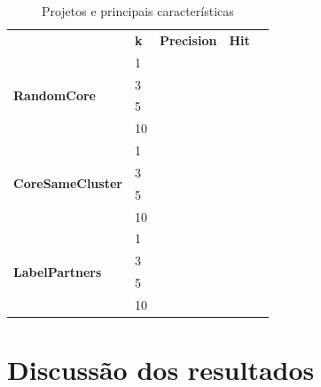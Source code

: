 \documentclass[12pt,openany,oneside,a4paper,english,brazil]{abntbibufjf}
\begin{document}
  \begin{table}[htbp]
  \caption{Projetos e principais características}
  \begin{center}
    \begin{tabular}{|l|l|l|l|l}
    \cline{1-4}
                                              & \textbf{k} & \textbf{Precision} & \textbf{Hit} &  \\ \cline{1-4}
    \multirow{4}{*}{\textbf{RandomCore}}      & 1          &                    &              &  \\ \cline{2-4}
                                              & 3          &                    &              &  \\ \cline{2-4}
                                              & 5          &                    &              &  \\ \cline{2-4}
                                              & 10         &                    &              &  \\ \cline{1-4}
    \multirow{4}{*}{\textbf{CoreSameCluster}} & 1          &                    &              &  \\ \cline{2-4}
                                              & 3          &                    &              &  \\ \cline{2-4}
                                              & 5          &                    &              &  \\ \cline{2-4}
                                              & 10         &                    &              &  \\ \cline{1-4}
    \multirow{4}{*}{\textbf{LabelPartners}}   & 1          &                    &              &  \\ \cline{2-4}
                                              & 3          &                    &              &  \\ \cline{2-4}
                                              & 5          &                    &              &  \\ \cline{2-4}
                                              & 10         &                    &              &  \\ \cline{1-4}
    \end{tabular}%
  \label{tab:sizemetrics}
  \end{center}
  \end{table}


  \section{Discussão dos resultados}\label{sec:discussao}
\end{document}

